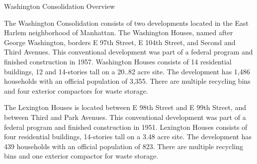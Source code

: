 Washington Consolidation Overview

The Washington Consolidation consists of two developments located in the East Harlem neighborhood of Manhattan. The Washington Houses, named after George Washington, borders E 97th Street, E 104th Street, and Second and Third Avenues. This conventional development was part of a federal program and finished construction in 1957. Washington Houses consists of 14 residential buildings, 12 and 14-stories tall on a 20..82 acre site. The development has 1,486 households with an official population of 3,355. There are multiple recycling bins and four exterior compactors for waste storage. 

The Lexington Houses is located between E 98th Street and E 99th Street, and between Third and Park Avenues. This conventional development was part of a federal program and finished construction in 1951. Lexington Houses consists of four residential buildings, 14-stories tall on a 3.48 acre site.  The development has 439 households with an official population of 823. There are multiple recycling bins and one exterior compactor for waste storage.